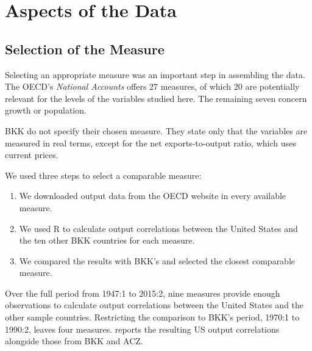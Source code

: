 \section{Aspects of the Data}

\subsection{Selection of the Measure \label{measure}}

Selecting an appropriate measure was an important step in assembling the data. The OECD's \textit{National Accounts} offers 27 measures, of which 20 are potentially relevant for the levels of the variables studied here. The remaining seven concern growth or population.

BKK do not specify their chosen measure. They state only that the variables are measured in real terms, except for the net exports-to-output ratio, which uses current prices.

We used three steps to select a comparable measure:

\begin{enumerate}
  \item We downloaded output data from the OECD website in every available measure.
  \item We used R to calculate output correlations between the United States and the ten other BKK countries for each measure.
  \item We compared the results with BKK's and selected the closest comparable measure.
\end{enumerate}

Over the full period from 1947:1 to 2015:2, nine measures provide enough observations to calculate output correlations between the United States and the other sample countries. Restricting the comparison to BKK's period, 1970:1 to 1990:2, leaves four measures.  reports the resulting US output correlations alongside those from BKK and ACZ.

